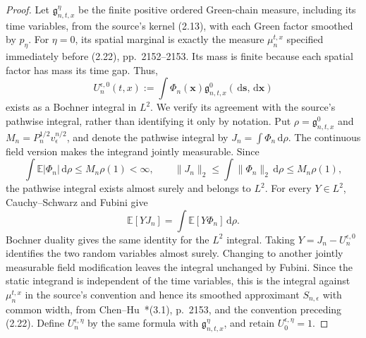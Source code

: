 \documentclass[12pt,oneside,openany]{book}
\numberwithin{equation}{section}
\theoremstyle{nogostyle}
\theoremstyle{definition}
\newcommand{\E}{\mathbb{E}}
\newcommand{\ud}{\,\mathrm{d}}
\begin{document}
\begin{proof}
  Let $\mathfrak{g}_{n,t,x}^{\eta}$ be the finite positive ordered Green-chain
  measure, including its time variables, from the source's kernel (2.13), with
  each Green factor smoothed by $p_\eta$. For $\eta = 0$, its spatial marginal
  is exactly the measure $\mu_n^{t,x}$ specified immediately before (2.22),
  pp.~2152--2153. Its mass is finite because each spatial factor has mass its
  time gap. Thus,
  \[
    U_n^{\epsilon,0}(t,x)
    :=\int\Phi_n(\mathbf{x})
    \mathfrak{g}_{n,t,x}^{0}(\ud\mathbf{s},\ud\mathbf{x})
  \]
  exists as a Bochner integral in $L^2$. We verify its agreement with the
  source's pathwise integral, rather than identifying it only by notation. Put
  $\rho = \mathfrak{g}_{n,t,x}^{0}$ and $M_n = P_n^{1/2}v_\epsilon^{n/2}$, and
  denote the pathwise integral by $J_n = \int\Phi_n\ud\rho$. The continuous
  field version makes the integrand jointly measurable. Since
  \[
    \int\E|\Phi_n|\ud\rho\le M_n\rho(1)<\infty,
    \qquad
    \|J_n\|_2
    \le\int\|\Phi_n\|_2\ud\rho\le M_n\rho(1),
  \]
  the pathwise integral exists almost surely and belongs to $L^2$. For every $Y
  \in L^2$, Cauchy--Schwarz and Fubini give
  \[
    \E[YJ_n]
    =\int\E[Y\Phi_n]\ud\rho.
  \]
  Bochner duality gives the same identity for the $L^2$ integral. Taking $Y =
  J_n-U_n^{\epsilon,0}$ identifies the two random variables almost surely.
  Changing to another jointly measurable field modification leaves the integral
  unchanged by Fubini. Since the static integrand is independent of the time
  variables, this is the integral against $\mu_n^{t,x}$ in the source's
  convention and hence its smoothed approximant $S_{n,\epsilon}$ with common
  width, from Chen--Hu~\cite{chen.hu:25:hyperbolic}*{(3.1), p.~2153, and the
  convention preceding (2.22)}. Define $U_n^{\epsilon,\eta}$ by the same formula
  with $\mathfrak{g}_{n,t,x}^{\eta}$, and retain $U_0^{\epsilon,\eta} = 1$.



\end{proof}
\end{document}
